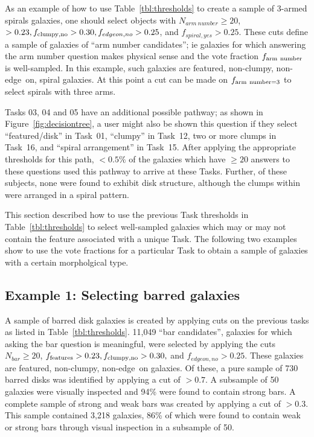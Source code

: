 \documentclass[twocolumn]{aastex6}
\begin{document}
As an example of how to use Table~\ref{tbl:thresholds} to create a sample of 3-armed spirals galaxies, one should select objects with $N_{arm~number} \ge 20$, \ffeatures$>0.23, f_{\rm clumpy,no} > 0.30, f_{edgeon,no}>0.25$, and $f_{spiral,yes}>0.25$. These cuts define a sample of galaxies of ``arm number candidates''; ie galaxies for which answering the arm number question makes physical sense and the vote fraction $f_{\rm arm~number}$ is well-sampled. In this example, such galaxies are featured, non-clumpy, non-edge~on, spiral galaxies. At this point a cut can be made on $f_{\rm arm~number=3}$ to select spirals with three arms. 

Tasks 03, 04 and 05 have an additional possible pathway; as shown in Figure~\ref{fig:decisiontree}, a user might also be shown this question if they select ``featured/disk'' in Task~01, ``clumpy'' in Task~12, two or more clumps in Task~16, and ``spiral arrangement'' in Task~15. After applying the appropriate thresholds for this path, $< 0.5\%$ of the galaxies which have $\ge 20$ answers to these questions used this pathway to arrive at these Tasks. Further, of these subjects, none were found to exhibit disk structure, although the clumps within were arranged in a spiral pattern. 

This section described how to use the previous Task thresholds in Table~\ref{tbl:thresholds} to select well-sampled galaxies which may or may not contain the feature associated with a unique Task. The following two examples show to use the vote fractions for a particular Task to obtain a sample of galaxies with a certain morpholgical type.

\subsection{Example 1: Selecting barred galaxies} 

A sample of barred disk galaxies is created by applying cuts on the previous tasks as listed in Table~\ref{tbl:thresholds}. 11,049 ``bar candidates'', galaxies for which asking the bar question is meaningful, were selected by applying the cuts $N_{bar} \ge 20$, $f_{\rm features}>0.23, f_{\rm clumpy,no} > 0.30,$ and $f_{edgeon,no}>0.25$. These galaxies are featured, non-clumpy, non-edge~on galaxies. Of these, a pure sample of 730 barred disks was identified by applying a cut of \fbar$>0.7$. A subsample of 50 galaxies were visually inspected and 94\% were found to contain strong bars. A complete sample of strong and weak bars was created by applying a cut of \fbar$>0.3$. This sample contained 3,218 galaxies, 86\% of which were found to contain weak or strong bars through visual inspection in a subsample of 50.
\end{document}
